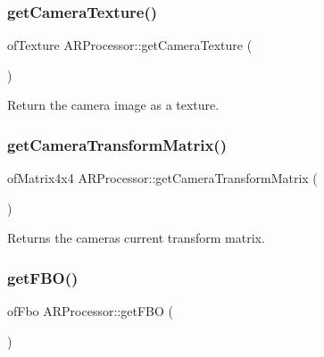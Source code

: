 \subsubsection{\texorpdfstring{get\+Camera\+Texture()}{getCameraTexture()}}
{\footnotesize\ttfamily of\+Texture A\+R\+Processor\+::get\+Camera\+Texture (\begin{DoxyParamCaption}{ }\end{DoxyParamCaption})\hspace{0.3cm}{\ttfamily [inline]}}



Return the camera image as a texture. 

\mbox{\label{class_a_r_processor_aea093b6d054daa0c75de6f7a492a19ff}} 
\subsubsection{\texorpdfstring{get\+Camera\+Transform\+Matrix()}{getCameraTransformMatrix()}}
{\footnotesize\ttfamily of\+Matrix4x4 A\+R\+Processor\+::get\+Camera\+Transform\+Matrix (\begin{DoxyParamCaption}{ }\end{DoxyParamCaption})\hspace{0.3cm}{\ttfamily [inline]}}



Returns the camera\textquotesingle{}s current transform matrix. 

\mbox{\label{class_a_r_processor_a8436dc786e91fb933879d90a4ab396d5}} 
\subsubsection{\texorpdfstring{get\+F\+B\+O()}{getFBO()}}
{\footnotesize\ttfamily of\+Fbo A\+R\+Processor\+::get\+F\+BO (\begin{DoxyParamCaption}{ }\end{DoxyParamCaption})\hspace{0.3cm}{\ttfamily [inline]}}



